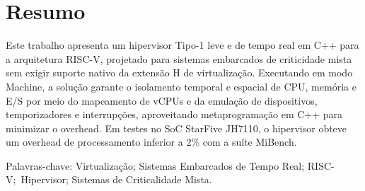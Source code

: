 \chapter{Resumo}


Este trabalho apresenta um hipervisor Tipo-1 leve e de tempo real em C++ para a arquitetura RISC-V, projetado para sistemas embarcados de criticidade mista sem
exigir suporte nativo da extensão H de virtualização. Executando em modo Machine, a solução garante o isolamento temporal e espacial de CPU, memória e E/S
por meio do mapeamento de vCPUs e da emulação de dispositivos, temporizadores e interrupções, aproveitando metaprogramação em C++ para minimizar o overhead.
Em testes no SoC StarFive JH7110, o hipervisor obteve um overhead de processamento inferior a 2\% com a suíte MiBench.

Palavras-chave: Virtualização; Sistemas Embarcados de Tempo Real; RISC-V;~Hipervisor; Sistemas de Criticalidade Mista.

